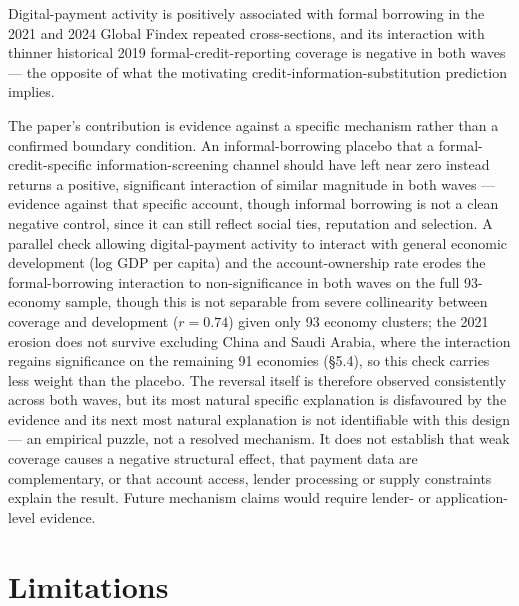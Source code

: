 Digital-payment activity is positively associated with formal borrowing in the 2021 and
2024 Global Findex repeated cross-sections, and its interaction with thinner historical
2019 formal-credit-reporting coverage is negative in both waves --- the opposite of what
the motivating credit-information-substitution prediction implies.

The paper's contribution is evidence against a specific mechanism rather than a confirmed
boundary condition. An informal-borrowing placebo that a formal-credit-specific
information-screening channel should have left near zero instead returns a positive,
significant interaction of similar magnitude in both waves --- evidence against that
specific account, though informal borrowing is not a clean negative control, since it can
still reflect social ties, reputation and selection. A parallel check allowing
digital-payment activity to interact with general economic development (log GDP per
capita) and the account-ownership rate erodes the formal-borrowing interaction to
non-significance in both waves on the full 93-economy sample, though this is not separable
from severe collinearity between coverage and development ($r=0.74$) given only 93 economy
clusters; the 2021 erosion does not survive excluding China and Saudi Arabia, where the
interaction regains significance on the remaining 91 economies (\S5.4), so this check
carries less weight than the placebo. The reversal
itself is therefore observed consistently across both waves, but its most natural specific
explanation is disfavoured by the evidence and its next most natural explanation is not
identifiable with this design --- an empirical puzzle, not a resolved mechanism. It does
not establish that weak coverage causes a negative structural effect, that payment data
are complementary, or that account access, lender processing or supply constraints
explain the result. Future mechanism claims would require lender- or application-level
evidence.

\section*{Limitations}


